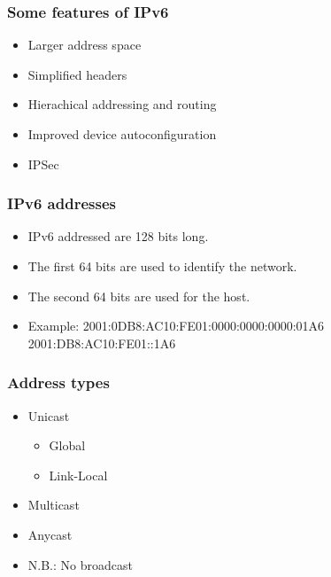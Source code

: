 \documentclass[10pt]{beamer}
\begin{document}
\begin{frame}
  \frametitle{Some features of IPv6}

 \begin{itemize}
  \item Larger address space
  \item Simplified headers
  \item Hierachical addressing and routing
  \item Improved device autoconfiguration
  \item IPSec
 \end{itemize}

\end{frame}


\begin{frame}
  \frametitle{IPv6 addresses}

 \begin{itemize}
  \item IPv6 addressed are 128 bits long.
  \item The first 64 bits are used to identify the network.
  \item The second 64 bits are used for the host.
  \item Example:
        2001:0DB8:AC10:FE01:0000:0000:0000:01A6 \\
        \hspace{15mm}2001:DB8:AC10:FE01::1A6
 \end{itemize}


\end{frame}


\begin{frame}
  \frametitle{Address types}

 \begin{itemize}
  \item Unicast
        \begin{itemize}
          \item Global
          \item Link-Local
        \end{itemize}
  \item Multicast
  \item Anycast
  \item N.B.: No broadcast 
 \end{itemize}

\end{frame}
\end{document}

